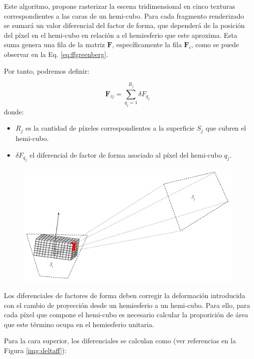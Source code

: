 Este algoritmo, propone rasterizar la escena tridimensional en cinco texturas correspondientes a las caras de un hemi-cubo. Para cada fragmento renderizado se sumará un valor diferencial del factor de forma, que dependerá de la posición del píxel en el hemi-cubo en relación a el hemiesferio que este aproxima.  Esta suma genera una fila de la matriz $\mathbf{F}$, específicamente la fila $\mathbf{F}_{i}$, como se puede observar en la Eq. \eqref{eq:ffgreenberg}.

Por tanto, podremos definir:

\begin{equation}
	\mathbf{F}_{ij} = \sum_{q_{j}=1}^{R_{j}} \delta{F_{q_{j}}}
	\label{eq:ffgreenberg}
\end{equation}
donde:
\begin{itemize}
	\item $R_{j}$ es la cantidad de píxeles correspondientes a la superficie $S_{j}$ que cubren el hemi-cubo.
	\item $\delta{F_{q_{j}}}$ el diferencial de factor de forma asociado al píxel del hemi-cubo $q_{j}$.
\end{itemize}

\vspace{5mm}
\begin{figure}[!ht]
	\centering
	\includegraphics[width=0.8\linewidth]{assets/Hemicube}
	\label{img:ff3}
\end{figure}

Los diferenciales de factores de forma deben corregir la deformación introducida con el cambio de proyección desde un hemiesferio a un hemi-cubo. Para ello, para cada píxel que compone el hemi-cubo es necesario calcular la proporición de área que este término ocupa en el hemiesferio unitaria.

Para la cara superior, los diferenciales se calculan como (ver referencias en la Figura \ref{img:deltaff}):

